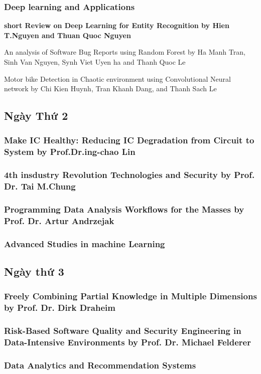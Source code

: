 \documentclass{hcmutarticle}
\begin{document}
\subsubsection{Deep learning and Applications}
\textbf{ short Review on Deep Learning for Entity Recognition by Hien T.Nguyen and Thuan Quoc Nguyen}

An analysis of Software Bug Reports using Random Forest by  
Ha Manh Tran, Sinh Van Nguyen, Synh Viet Uyen ha and Thanh Quoc Le

Motor bike Detection in Chaotic environment using Convolutional Neural network by Chi Kien Huynh, Tran Khanh Dang, and Thanh Sach Le


\subsection{Ngày Thứ 2}

 


\subsubsection{Make IC Healthy: Reducing IC Degradation from Circuit to System by Prof.Dr.ing-chao Lin}

\subsubsection{4th insdustry Revolution Technologies and Security by Prof. Dr. Tai M.Chung}

\subsubsection{Programming Data Analysis Workflows for the Masses by Prof. Dr. Artur Andrzejak}

\subsubsection{Advanced Studies in machine Learning}

\subsection{Ngày thứ 3}
\subsubsection{Freely Combining Partial Knowledge in Multiple Dimensions
by Prof. Dr. Dirk Draheim}
\subsubsection{Risk-Based Software Quality and Security Engineering in Data-Intensive Environments
by Prof. Dr. Michael Felderer}
\subsubsection{ Data Analytics and Recommendation Systems}
\end{document}
